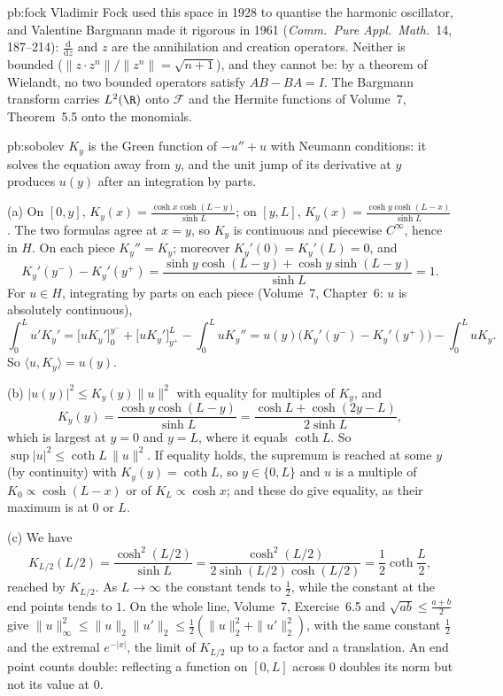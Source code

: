 \begin{solution}{pb:fock}
\leads Vladimir Fock used this space in 1928 to quantise the harmonic oscillator, and Valentine Bargmann made it rigorous in 1961 (\emph{Comm.\ Pure Appl.\ Math.}\ 14, 187--214):
$\frac{\mathrm d}{\mathrm dz}$ and $z$ are the annihilation and creation operators. Neither is bounded ($\|z\cdot z^n\|/\|z^n\|=\sqrt{n+1}$), and they cannot be: by a theorem of
Wielandt, no two bounded operators satisfy $AB-BA=I$. The Bargmann transform carries $L^2(\R)$ onto $\mathcal F$ and the Hermite functions of Volume~7, Theorem~5.5 onto the monomials.
\end{solution}

\begin{solution}{pb:sobolev}
\idea $K_y$ is the Green function of $-u''+u$ with Neumann conditions: it solves the equation away from $y$, and the unit jump of its derivative at $y$ produces $u(y)$
after an integration by parts.

\writeup (a) On $[0,y]$, $K_y(x)=\frac{\cosh x\cosh(L-y)}{\sinh L}$; on $[y,L]$, $K_y(x)=\frac{\cosh y\cosh(L-x)}{\sinh L}$. The two formulas agree at $x=y$, so $K_y$ is continuous and
piecewise $C^\infty$, hence in $H$. On each piece $K_y''=K_y$; moreover $K_y'(0)=K_y'(L)=0$, and
\[
K_y'(y^-)-K_y'(y^+)=\frac{\sinh y\cosh(L-y)+\cosh y\sinh(L-y)}{\sinh L}=1.
\]
For $u\in H$, integrating by parts on each piece (Volume~7, Chapter~6: $u$ is absolutely continuous),
\[
\int_0^Lu'K_y'=\bigl[uK_y'\bigr]_0^{y^-}+\bigl[uK_y'\bigr]_{y^+}^L-\int_0^LuK_y''=u(y)\bigl(K_y'(y^-)-K_y'(y^+)\bigr)-\int_0^LuK_y.
\]
So $\langle u,K_y\rangle=u(y)$.

(b) $|u(y)|^2\le K_y(y)\|u\|^2$ with equality for multiples of $K_y$, and
\[
K_y(y)=\frac{\cosh y\cosh(L-y)}{\sinh L}=\frac{\cosh L+\cosh(2y-L)}{2\sinh L},
\]
which is largest at $y=0$ and $y=L$, where it equals $\coth L$. So $\sup|u|^2\le\coth L\,\|u\|^2$. If equality holds, the supremum is reached at some $y$ (by continuity) with
$K_y(y)=\coth L$, so $y\in\{0,L\}$ and $u$ is a multiple of $K_0\propto\cosh(L-x)$ or of $K_L\propto\cosh x$; and these do give equality, as their maximum is at $0$ or $L$.

(c) We have
\[
K_{L/2}(L/2)=\frac{\cosh^2(L/2)}{\sinh L}=\frac{\cosh^2(L/2)}{2\sinh(L/2)\cosh(L/2)}=\frac12\coth\frac L2,
\]
reached by $K_{L/2}$. As $L\to\infty$ the constant tends to $\frac12$, while
the constant at the end points tends to $1$. On the whole line, Volume~7, Exercise~6.5 and $\sqrt{ab}\le\frac{a+b}2$ give $\|u\|_\infty^2\le\|u\|_2\|u'\|_2\le\frac12(\|u\|_2^2+\|u'\|_2^2)$, with the
same constant $\frac12$ and the extremal $e^{-|x|}$, the limit of $K_{L/2}$ up to a factor and a translation. An end point counts double: reflecting a function on $[0,L]$ across $0$ doubles its
norm but not its value at $0$.


\end{solution}
